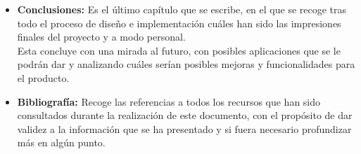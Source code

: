 \begin{itemize}
    \item \textbf{Conclusiones:} Es el último capítulo que se escribe, en el que se recoge tras todo el proceso de diseño e implementación cuáles han sido las impresiones finales del proyecto y a modo personal. \\ Esta concluye con una mirada al futuro, con posibles aplicaciones que se le podrán dar y analizando cuáles serían posibles mejoras y funcionalidades para el producto. 
    \item \textbf{Bibliografía:} Recoge las referencias a todos los recursos que han sido consultados durante la realización de este documento, con el propósito de dar validez a la información que se ha presentado y si fuera necesario profundizar más en algún punto.
\end{itemize}